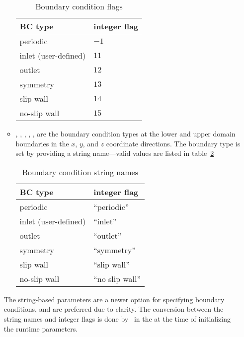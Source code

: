 \begin{itemize}
\begin{itemize}
   \begin{table}[h]
   \caption{\label{gs:table:bcflags} Boundary condition flags}  
   \begin{center}
   \begin{tabular}{ll}
   \hline
   BC type    & integer flag \\
   \hline
   periodic             & $-1$ \\
   inlet (user-defined) & $11$ \\
   outlet               & $12$ \\
   symmetry             & $13$ \\
   slip wall            & $14$ \\
   no-slip wall         & $15$ \\
   \hline
   \end{tabular}
   \end{center}
   \end{table}

   \item {}, , , , , 
   are the boundary condition types at the lower and upper domain
   boundaries in the $x$, $y$, and $z$ coordinate directions.  The
   boundary type is set by providing a string name---valid values are
   listed in table~\ref{gs:table:bcstrings}

   \begin{table}[h]
   \caption{\label{gs:table:bcstrings} Boundary condition string names}  
   \begin{center}
   \begin{tabular}{ll}
   \hline
   BC type    & integer flag \\
   \hline
   periodic             & ``periodic'' \\
   inlet (user-defined) & ``inlet'' \\
   outlet               & ``outlet'' \\
   symmetry             & ``symmetry'' \\
   slip wall            & ``slip wall'' \\
   no-slip wall         & ``no slip wall'' \\
   \hline
   \end{tabular}
   \end{center}
   \end{table}

   \end{itemize}

  The string-based parameters are a newer option for specifying
  boundary conditions, and are preferred due to clarity.  The
  conversion between the string names and integer flags is done
  by \amrex\ in the  at the time of initializing
  the runtime parameters.

\end{itemize}

